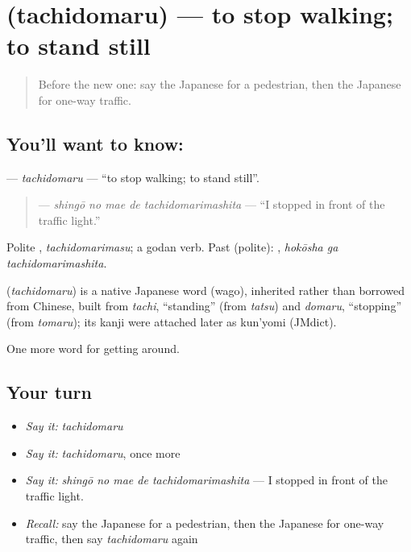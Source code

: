 \section[\texorpdfstring{\ja{たちどまる} (tachidomaru)}{たちどまる (tachidomaru)}]{ (tachidomaru) — to stop walking; to stand still}

\label{lesson:JA-C391-tachidomaru}



\begin{quote}
Before the new one: say the Japanese for a pedestrian, then the Japanese for one-way traffic.
\end{quote}

\subsection*{You'll want to know: }
\textbf{} — \emph{tachidomaru} — \textquotedblleft{}to stop walking; to stand still\textquotedblright{}.

\begin{quote}
\textbf{  } — \emph{shingō no mae de tachidomarimashita} — \textquotedblleft{}I stopped in front of the traffic light.\textquotedblright{}
\end{quote}

Polite \textbf{}, \emph{tachidomarimasu}; a godan verb. Past (polite): \textbf{ }, \emph{hokōsha ga tachidomarimashita}.

\begin{cousinweb}
\textbf{} (\emph{tachidomaru}) is a native Japanese word (wago), inherited rather than borrowed from Chinese, built from \emph{tachi}, \textquotedblleft{}standing\textquotedblright{} (from \emph{tatsu}) and \emph{domaru}, \textquotedblleft{}stopping\textquotedblright{} (from \emph{tomaru}); its kanji were attached later as kun'yomi (JMdict).
\end{cousinweb}

\begin{grammarlens}[title={What you've built}]
One more word for getting around.
\end{grammarlens}

\subsection*{Your turn}
\begin{itemize}
\raggedright
  \item \emph{Say it:} \emph{tachidomaru}
  \item \emph{Say it:} \emph{tachidomaru}, once more
  \item \emph{Say it:} \emph{shingō no mae de tachidomarimashita} — I stopped in front of the traffic light.
  \item \emph{Recall:} say the Japanese for a pedestrian, then the Japanese for one-way traffic, then say \emph{tachidomaru} again
\end{itemize}

